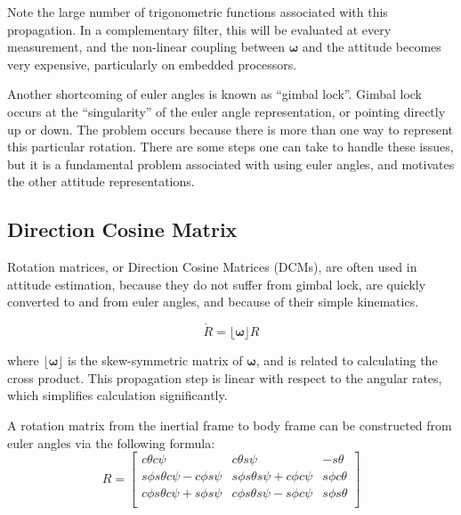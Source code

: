 \documentclass[paper=a4, fontsize=11pt]{scrartcl} %
\numberwithin{equation}{section} %
\numberwithin{figure}{section} %
\numberwithin{table}{section} %
\begin{document}
Note the large number of trigonometric functions associated with this propagation.  In a complementary filter, this will be evaluated at every measurement, and the non-linear coupling between $\bm{\omega}$  and the attitude becomes very expensive, particularly on embedded processors.

Another shortcoming of euler angles is known as ``gimbal lock''.  Gimbal lock occurs at the ``singularity'' of the euler angle representation, or pointing directly up or down.  The problem occurs because there is more than one way to represent this particular rotation.  There are some steps one can take to handle these issues, but it is a fundamental problem associated with using euler angles, and motivates the other attitude representations. 

\subsection{Direction Cosine Matrix}

Rotation matrices, or Direction Cosine Matrices (DCMs), are often used in attitude estimation, because they do not suffer from gimbal lock, are quickly converted to and from euler angles, and because of their simple kinematics.

\begin{equation}
	\dot{R} = \lfloor\bm{\omega}\rfloor R
\end{equation}

where $\lfloor \bm{\omega} \rfloor$ is the skew-symmetric matrix of $\bm{\omega}$, and is related to calculating the cross product.  This propagation step is linear with respect to the angular rates, which simplifies calculation significantly.

A rotation matrix from the inertial frame to body frame can be constructed from euler angles via the following formula:
\newcommand{\ct}{c\theta}
\newcommand{\cp}{c\phi}
\newcommand{\cs}{c\psi}
\newcommand{\st}{s\theta}
\newcommand{\sphi}{s\phi}
\newcommand{\spsi}{s\psi}
\begin{equation}
	    R = \begin{bmatrix}
	    	\ct\cs & \ct\spsi & -\st \\
        \sphi\st\cs-\cp\spsi & \sphi\st\spsi+\cp\cs & \sphi\ct \\
        \cp\st\cs+\sphi\spsi & \cp\st\spsi-\sphi\cs & \sphi\st \\
        \end{bmatrix}
\end{equation}
\end{document}
